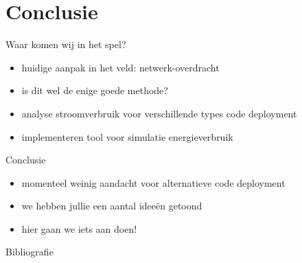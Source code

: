\documentclass[presentation, bigger]{beamer}
\begin{document}
\section{Conclusie}
\label{sec-4}
\begin{frame}[label=sec-4-1]{Waar komen wij in het spel?}
  \begin{itemize}
  \item huidige aanpak in het veld: netwerk-overdracht
  \item is dit wel de enige goede methode?
  \item analyse stroomverbruik voor verschillende types code deployment
  \item implementeren tool voor simulatie energieverbruik
  \end{itemize}
\end{frame}

\begin{frame}[label=sec-4-2]{Conclusie}
  \begin{itemize}
  \item momenteel weinig aandacht voor alternatieve code deployment
  \item we hebben jullie een aantal idee\"en getoond 
  \item hier gaan we iets aan doen!
  \end{itemize}
\end{frame}
\begin{frame}[allowframebreaks]{Bibliografie}
  \nocite{*}
  \printbibliography
\end{frame}

\end{document}
